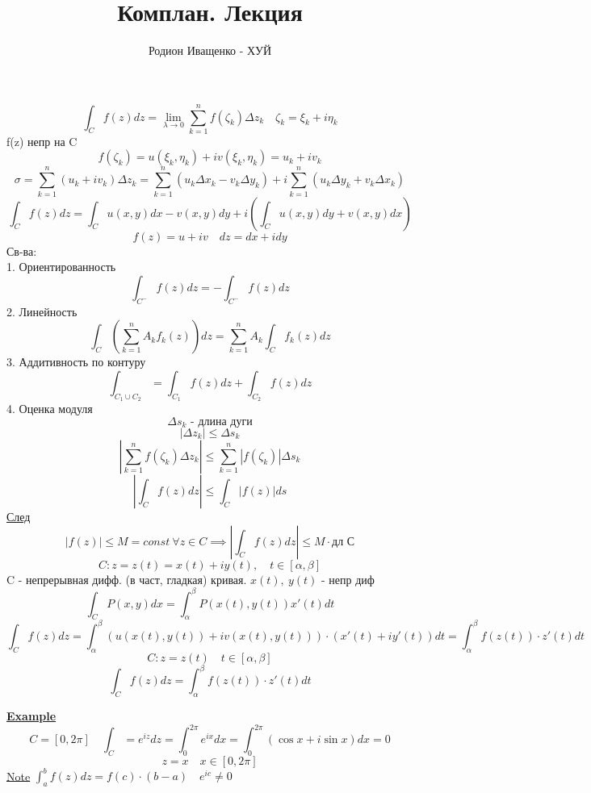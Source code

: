 \documentclass[a4paper]{article}
\begin{document}
\title{Комплан. Лекция}
\author{Родион Иващенко - ХУЙ}
\maketitle

\[
    \int_{C} f(z)dz = \lim_{\lambda \to 0} \sum_{k=1}^{n} f(\zeta_k) \Delta z_k
    \quad \zeta_k = \xi_k + i \eta_k
\]
f(z) непр на C
\[
    f(\zeta_k) = u(\xi_k, \eta_k) + iv(\xi_k, \eta_k) = u_k + iv_k
\]
\[
    \sigma = \sum_{k=1}^{n} (u_k + i v_k) \Delta z_k = \sum_{k=1}^{n} (u_k \Delta x_k - v_k 
    \Delta y_k) + i \sum_{k=1}^{n} (u_k \Delta y_k + v_k \Delta x_k)
\]
\[
    \int_{C}f(z)dz = \int_{C} u(x,y)dx - v(x,y)dy + i\left(\int_{C}u(x,y)dy + v(x,y)dx\right)
\]
\[
    f(z) = u + iv \quad dz = dx + idy
\]
Св-ва:\\
1. Ориентированность
\[
    \int_{C^{-}} f(z)dz = -\int_{C^{-}} f(z)dz
\]
2. Линейность
\[
    \int_{C} \left( \sum_{k=1}^{n} A_k f_k(z) \right) dz = \sum_{k=1}^{n} A_k
    \int_{C} f_k(z) dz
\]
3. Аддитивность по контуру
\[
    \int_{C_1 \cup C_2} = \int_{C_1}f(z)dz + \int_{C_2}f(z)dz
\]
4. Оценка модуля 
\[
    \Delta s_k \text{ - длина дуги}
\]
\[
    |\Delta z_k| \leq \Delta s_k
\]
\[
    |\sum_{k=1}^{n} f(\zeta_k) \Delta z_k| \leq \sum_{k=1}^{n} |f(\zeta_k)| 
    \Delta s_k
\]
\[
    \left| \int_{C} f(z)dz \right| \leq\int_{C} |f(z)|ds
\]
\underline{След}
\[
    |f(z)| \leq M = const\  \forall z \in C \implies \left| \int_{C} f(z) dz \right| \leq
    M \cdot \text{дл С}
\]
\[
    C: z = z(t) = x(t) + iy(t), \quad t \in [\alpha, \beta]
\]
C - непрерывная дифф. (в част, гладкая) кривая. $ x(t), \ y(t) $ - непр диф
\[
    \int_C P(x,y)dx = \int_{\alpha}^{\beta} P(x(t), y(t)) x'(t)dt
\]
\[
    \int_C f(z) dz = \int_{\alpha}^{\beta} ( u(x(t), y(t)) + iv(x(t), y(t)) )
    \cdot (x'(t) + iy'(t)) dt = \int_{\alpha}^{\beta} f(z(t)) \cdot z'(t) dt
\]
\[
    C: z = z(t) \quad t \in [\alpha, \beta]
\]
\[
    \int_C f(z) dz = \int_{\alpha}^{\beta} f(z(t)) \cdot z'(t) dt
\]

\underline{\textbf{Example}}
\[
    C = [0, 2\pi] \quad \int_C = e^{iz}dz = \int_{0}^{2\pi} e^{ix}dx = 
    \int_{0}^{2\pi} ( \cos x + i \sin x) dx = 0
\]
\[
    z = x \quad x \in [0, 2\pi]
\]
\underline{Note} $ \int_{a}^{b} f(z) dz = f(c) \cdot (b-a) \quad e^{ic} \neq 0 $ 
\end{document}
